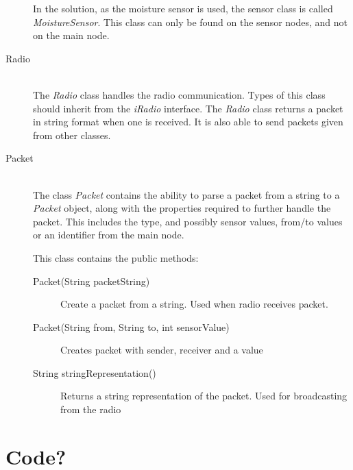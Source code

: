\begin{description}
In the solution, as the moisture sensor is used, the sensor class is called \textit{MoistureSensor}. This class can only be found on the sensor nodes, and not on the main node.


\item[Radio] \hfill \\
The \textit{Radio} class handles the radio communication. Types of this class should inherit from the \textit{iRadio} interface. The \textit{Radio} class returns a packet in string format when one is received. It is also able to send packets given from other classes.

\item[Packet] \hfill \\
The class \textit{Packet} contains the ability to parse a packet from a string to a \textit{Packet} object, along with the properties required to further handle the packet. This includes the type, and possibly sensor values, from/to values or an identifier from the main node.


This class contains the public methods:
\begin{description}
\item[Packet(String packetString)] Create a packet from a string. Used when radio receives packet.
\item[Packet(String from, String to, int sensorValue)] Creates packet with sender, receiver and a value
\item[String stringRepresentation()] Returns a string representation of the packet. Used for broadcasting from the radio
\end{description}

\end{description}


\section{Code?}
